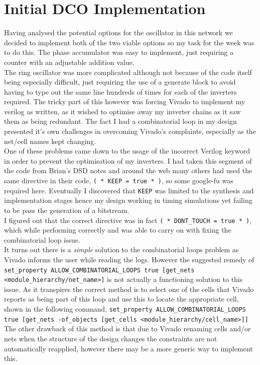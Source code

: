 \documentclass[a4paper,12pt]{report}
\begin{document}
\section*{Initial DCO Implementation}
Having analysed the potential options for the oscillator in this network we decided to implement both of the two viable options so my task for the week was to do this. The phase accumulator was easy to implement, just requiring a counter with an adjustable addition value.\\
The ring oscillator was more complicated although not because of the code itself being especially difficult, just requiring the use of a generate block to avoid having to type out the same line hundreds of times for each of the inverters required. The tricky part of this however was forcing Vivado to implement my verilog as written, as it wished to optimise away my inverter chains as it saw them as being redundant. The fact I had a combinatorial loop in my design presented it's own challenges in overcoming Vivado's complaints, especially as the net/cell names kept changing.\\
One of these problems came down to the usage of the incorrect Verilog keyword in order to prevent the optimisation of my inverters. I had taken this segment of the code from Brian's DSD notes and around the web many others had used the same directive in their code, \texttt{( * KEEP = true * )}, so some google-fu was required here.
Eventually I discovered that \texttt{KEEP} was limited to the synthesis and implementation stages hence my design working in timing simulations yet failing to be pass the generation of a bitstream.\\
I figured out that the correct directive was in fact \texttt{( * DONT\_TOUCH = true * )}, which while performing correctly and was able to carry on with fixing the combinatorial loop issue.\\
It turns out there is a \textit{simple} solution to the combinatorial loops problem as Vivado informs the user while reading the logs. However the suggested remedy of \newline
\texttt{set\_property ALLOW\_COMBINATORIAL\_LOOPS true [get\_nets \\<module\_hierarchy/net\_name>]}\newline
is not actually a functioning solution to this issue.
As it transpires the correct method is to select one of the cells that Vivado reports as being part of this loop and use this to locate the appropriate cell, shown in the following command.\newline
\texttt{set\_property ALLOW\_COMBINATORIAL\_LOOPS true [get\_nets -of\_objects [get\_cells <module\_hierarchy/cell\_name>]]}\newline
The other drawback of this method is that due to Vivado renaming cells and/or nets when the structure of the design changes the constraints are not automatically reapplied, however there may be a more generic way to implement this.
\end{document}
